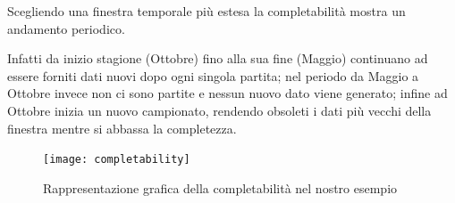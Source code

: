Scegliendo una finestra temporale più estesa la completabilità mostra un andamento periodico.

Infatti da inizio stagione (Ottobre) fino alla sua fine (Maggio) continuano ad essere forniti dati nuovi dopo ogni singola partita; nel periodo da Maggio a Ottobre invece non ci sono partite e nessun nuovo dato viene generato; infine ad Ottobre inizia un nuovo campionato, rendendo obsoleti i dati più vecchi della finestra mentre si abbassa la completezza.


\begin{figure}
\caption{Rappresentazione grafica della completabilità nel nostro esempio}
\label{completabilitypic}
\texttt{[image: completability]}
\end{figure}